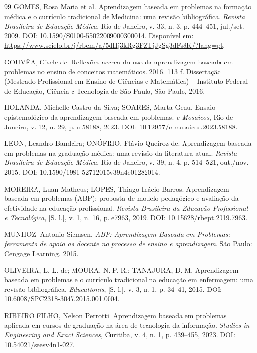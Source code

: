\begin{thebibliography}{99}
GOMES, Rosa Maria et al. Aprendizagem baseada em problemas na formação médica e o currículo tradicional de Medicina: uma revisão bibliográfica. \textit{Revista Brasileira de Educação Médica}, Rio de Janeiro, v. 33, n. 3, p. 444--451, jul./set. 2009. DOI: 10.1590/S0100-55022009000300014. Disponível em: \url{https://www.scielo.br/j/rbem/a/5dHj3kRg3FZTjJgSg3dFs8K/?lang=pt}.

GOUVÊA, Gisele de. Reflexões acerca do uso da aprendizagem baseada em problemas no ensino de conceitos matemáticos. 2016. 113 f. Dissertação (Mestrado Profissional em Ensino de Ciências e Matemática) -- Instituto Federal de Educação, Ciência e Tecnologia de São Paulo, São Paulo, 2016.

HOLANDA, Michelle Castro da Silva; SOARES, Marta Genu. Ensaio epistemológico da aprendizagem baseada em problemas. \textit{e-Mosaicos}, Rio de Janeiro, v. 12, n. 29, p. e-58188, 2023. DOI: 10.12957/e-mosaicos.2023.58188.

LEON, Leandro Bandeira; ONÓFRIO, Flávio Queiroz de. Aprendizagem baseada em problemas na graduação médica: uma revisão da literatura atual. \textit{Revista Brasileira de Educação Médica}, Rio de Janeiro, v. 39, n. 4, p. 514--521, out./nov. 2015. DOI: 10.1590/1981-52712015v39n4e01282014.

MOREIRA, Luan Matheus; LOPES, Thiago Inácio Barros. Aprendizagem baseada em problemas (ABP): proposta de modelo pedagógico e avaliação da efetividade na educação profissional. \textit{Revista Brasileira da Educação Profissional e Tecnológica}, [S. l.], v. 1, n. 16, p. e7963, 2019. DOI: 10.15628/rbept.2019.7963.

MUNHOZ, Antonio Siemsen. \textit{ABP: Aprendizagem Baseada em Problemas: ferramenta de apoio ao docente no processo de ensino e aprendizagem}. São Paulo: Cengage Learning, 2015.

OLIVEIRA, L. L. de; MOURA, N. P. R.; TANAJURA, D. M. Aprendizagem baseada em problemas e o currículo tradicional na educação em enfermagem: uma revisão bibliográfica. \textit{Educationis}, [S. l.], v. 3, n. 1, p. 34--41, 2015. DOI: 10.6008/SPC2318-3047.2015.001.0004.

RIBEIRO FILHO, Nelson Perrotti. Aprendizagem baseada em problemas aplicada em cursos de graduação na área de tecnologia da informação. \textit{Studies in Engineering and Exact Sciences}, Curitiba, v. 4, n. 1, p. 439--455, 2023. DOI: 10.54021/seesv4n1-027.


\end{thebibliography}
